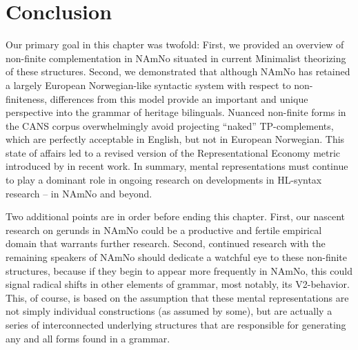 \documentclass[output=paper,colorlinks,citecolor=brown]{langscibook}
\begin{document}
\section{Conclusion} \label{outro}

Our primary goal in this chapter was twofold: First, we provided an overview of non-finite complementation in NAmNo situated in current Minimalist theorizing of these structures. Second, we demonstrated that although NAmNo has retained a largely European Norwegian-like syntactic system with respect to non-finiteness, differences from this model provide an important and unique perspective into the grammar of heritage bilinguals. Nuanced non-finite forms in the CANS corpus overwhelmingly avoid projecting “naked” TP-complements, which are perfectly acceptable in English, but not in European Norwegian. This state of affairs led to a revised version of the Representational Economy metric introduced by \citet{putPDtoappear} in recent work. In summary, mental representations must continue to play a dominant role in ongoing research on developments in HL-syntax research -- in NAmNo and beyond. 

Two additional points are in order before ending this chapter. First, our nascent research on gerunds in NAmNo could be a productive and fertile empirical domain that warrants further research. Second, continued research with the remaining speakers of NAmNo should dedicate a watchful eye to these non-finite structures, because if they begin to appear more frequently in NAmNo, this could signal radical shifts in other elements of grammar, most notably, its V2-behavior. This, of course, is based on the assumption that these mental representations are not simply individual constructions (as assumed by some), but are actually a series of interconnected underlying structures that are responsible for generating any and all forms found in a grammar. 



\end{document}
